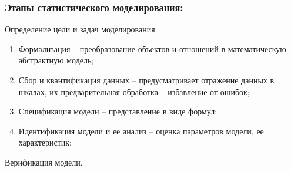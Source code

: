     \subsubsection*{Этапы статистического моделирования:}
    Определение цели и задач моделирования
    \begin{enumerate}
        \item Формализация -- преобразование объектов и отношений в математическую абстрактную модель;
        \item Сбор и квантификация данных -- предусматривает отражение данных в шкалах, их предварительная обработка -- избавление от ошибок;
        \item Спецификация модели -- представление в виде формул;
        \item Идентификация модели и ее анализ -- оценка параметров модели, ее характеристик;
    \end{enumerate}
    Верификация модели.
